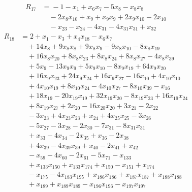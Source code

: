 \begin{align*}
R_{17}&={}-1 -x_{1} +x_{6}x_{7} -5x_{8} -x_{8}x_{8}\\
&\quad{}-2x_{8}x_{10} +x_{9} +x_{9}x_{9} +2x_{9}x_{10} -2x_{10}\\
&\quad{}-x_{23} -x_{24} -4x_{31} -4x_{31}x_{31} +x_{32}
\end{align*}
\begin{align*}
R_{18}&={}2 +x_{1} -x_{3} +x_{4}x_{18} -x_{6}x_{7}\\
&\quad{}+14x_{8} +9x_{8}x_{8} +9x_{8}x_{9} -9x_{8}x_{10} -8x_{8}x_{19}\\
&\quad{}+16x_{8}x_{20} +8x_{8}x_{23} +8x_{8}x_{24} +8x_{8}x_{27} -4x_{8}x_{39}\\
&\quad{}+5x_{9} -13x_{9}x_{9} +5x_{9}x_{10} -8x_{9}x_{19} +64x_{9}x_{20}\\
&\quad{}+16x_{9}x_{23} +24x_{9}x_{24} +16x_{9}x_{27} -16x_{10} +4x_{10}x_{10}\\
&\quad{}+4x_{10}x_{19} +8x_{10}x_{24} -4x_{10}x_{27} -8x_{10}x_{39} -x_{16}\\
&\quad{}+18x_{19} -20x_{19}x_{19} +32x_{19}x_{20} -8x_{19}x_{23} +16x_{19}x_{24}\\
&\quad{}+8x_{19}x_{27} +2x_{20} -16x_{20}x_{20} +3x_{21} -2x_{22}\\
&\quad{}-3x_{23} +4x_{23}x_{23} +x_{24} +4x_{25}x_{25} -3x_{26}\\
&\quad{}-5x_{27} -3x_{28} -2x_{30} -7x_{31} -8x_{31}x_{31}\\
&\quad{}+x_{33} -4x_{34} -2x_{35} +x_{36} -2x_{38}\\
&\quad{}+4x_{39} -4x_{39}x_{39} +x_{40} -2x_{41} +x_{42}\\
&\quad{}-x_{59} -4x_{60} -2x_{61} -5x_{71} -x_{133}\\
&\quad{}+x_{133}x_{150} +x_{133}x_{174} +x_{150} -x_{151} +x_{174}\\
&\quad{}-x_{175} -4x_{183}x_{195} +x_{186}x_{186} +x_{187}x_{187} +x_{188}x_{188}\\
&\quad{}+x_{189} +x_{189}x_{189} -x_{196}x_{196} -x_{197}x_{197}
\end{align*}
